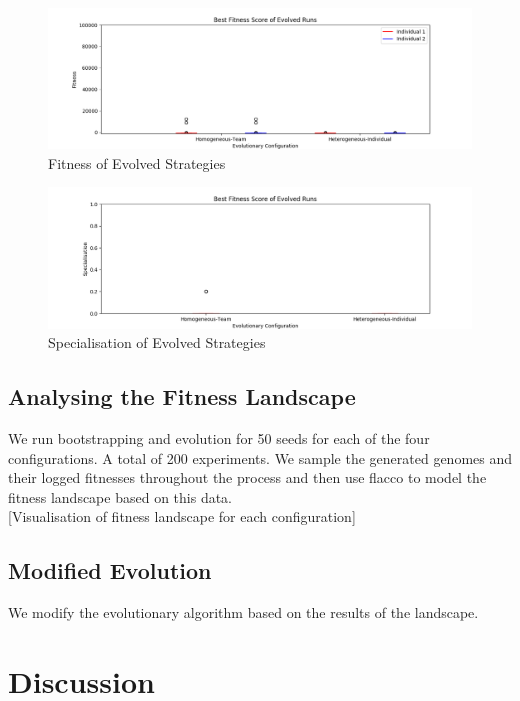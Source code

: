 \documentclass[12pt]{article}  %
\begin{document}
\begin{figure}
	\centering
	\includegraphics[width=\textwidth]{evolution_fitness.png}
	\caption{Fitness of Evolved Strategies}
	\label{fig:evolved}
\end{figure}

\begin{figure}
	\centering
	\includegraphics[width=\textwidth]{evolution_specialisation.png}
	\caption{Specialisation of Evolved Strategies}
	\label{fig:evolved_spec}
\end{figure}





\subsection{Analysing the Fitness Landscape}
We run bootstrapping and evolution for 50 seeds for each of the four configurations. A total of 200 experiments. 
We sample the generated genomes and their logged fitnesses throughout the process and then use flacco to model the fitness landscape based on this data.\\

[Visualisation of fitness landscape for each configuration]

\subsection{Modified Evolution}

We modify the evolutionary algorithm based on the results of the landscape.

\section{Discussion}
\end{document}
